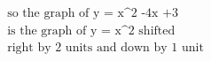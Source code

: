 \documentclass[preview]{standalone}
\begin{document}
\begin{align*}
\text{so the graph of y = x^2 -4x +3 } \\ \text{is the graph of y = x^2 shifted} \\ \text{right by 2 units and down by 1 unit}
\end{align*}
\end{document}
